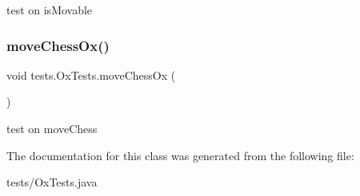 test on is\+Movable \mbox{\label{classtests_1_1_ox_tests_a240476c2b7dda99ff721574bc2298fc9}} 
\subsubsection{\texorpdfstring{move\+Chess\+Ox()}{moveChessOx()}}
{\footnotesize\ttfamily void tests.\+Ox\+Tests.\+move\+Chess\+Ox (\begin{DoxyParamCaption}{ }\end{DoxyParamCaption})\hspace{0.3cm}{\ttfamily [inline]}}

test on move\+Chess 

The documentation for this class was generated from the following file\+:\begin{DoxyCompactItemize}
\item 
tests/Ox\+Tests.\+java\end{DoxyCompactItemize}
